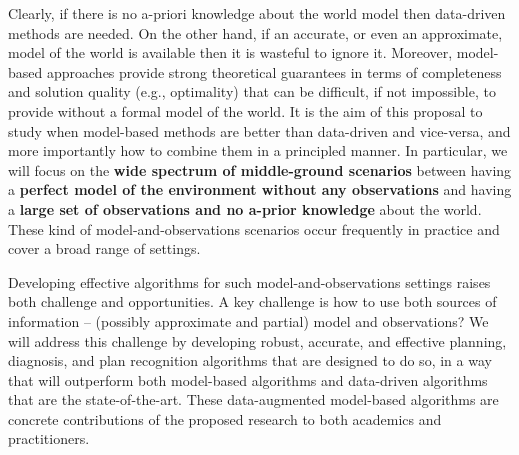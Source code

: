 \documentclass[12pt]{article}
\begin{document}
Clearly, if there is no a-priori knowledge about the world model then data-driven methods are needed. On the other hand, if an accurate, or even an approximate, model of the world is available then it is wasteful to ignore it. %
Moreover, model-based approaches provide strong theoretical guarantees in terms of completeness and solution quality (e.g., optimality) that can be difficult, if not impossible, to provide without a formal model of the world. %
It is the aim of this proposal to study when model-based methods are better than data-driven and vice-versa, and more importantly how to combine them in a principled manner. In particular, we will focus on the {\bf wide spectrum of middle-ground scenarios} between having a {\bf perfect model of the environment without any observations} and having a {\bf large set of observations and no a-prior knowledge} about the world. These kind of model-and-observations scenarios occur frequently in practice and cover a broad range of settings. %



Developing effective algorithms for such model-and-observations settings raises both challenge and opportunities. A key challenge is how to use both sources of information -- (possibly approximate and partial) model and observations? 
We will address this challenge by developing robust, accurate, and effective planning, diagnosis, and plan recognition algorithms that are designed to do so, in a way that will outperform both model-based algorithms and data-driven algorithms that are the state-of-the-art. These data-augmented model-based algorithms are concrete contributions of the proposed research to both academics and practitioners. 
\end{document}
